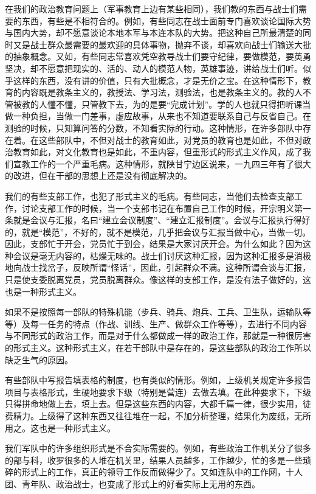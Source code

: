 在我们的政治教育问题上（军事教育上边有某些相同），我们教的东西与战士们需要的东西，有些是不相符合的。例如，有些同志在战士面前专门喜欢谈论国际大势与国内大势，却不愿意谈论本地本军与本连本队的大势。把这种自己所最清楚的同时又是战士群众最需要的最欢迎的具体事物，抛弃不谈，却喜欢向战士们输送大批的抽象概念。又如，有些同志常喜欢凭空教导战士们要守纪律，要做模范，要英勇坚决，却不愿意把现实的、活的、动人的模范人物，英雄事迹，讲给战士们听。似乎这样的东西，没有讲的价值，只有大批概念，才是无价之宝。在这种情形下，教育的内容既是教条主义的，教授法、学习法，测验法，也是教条主义的。教的人不管被教的人懂不懂，只管教下去，为的是要“完成计划”。学的人也就只得把听课当做一种负担，当做一门差事，虚应故事，从来也不知道要联系自己与反省自己。在测验的时候，只知算问答的分数，不知看实际的行动。这种情形，在许多部队中存在着。在这些部队中，不但对战士的教育如此，对党员的教育也是如此，不但对政治教育如此，对文化教育也是如此，不重内容，但重形式的形式主义作风，成了我们宣教工作的一个严重毛病。这种情形，就陕甘宁边区说来，一九四三年有了很大的改进，但在干部的思想上还是没有彻底解决的。

我们的有些支部工作，也犯了形式主义的毛病。有些同志，当他们去检查支部工作，讨论支部工作的时候，当一个支部书记在布置自己工作的时候，开宗明义第一条就是会议与汇报，名曰“建立会议制度”、“建立汇报制度”。会议与汇报执行得好的，就是“模范”，不好的，就不是模范，几乎把会议与汇报当做中心，当做一切。因此，支部忙于开会，党员忙于到会，结果是大家讨厌开会。为什么如此？因为这种会议是毫无内容的，枯燥无味的。战士们讨厌这种汇报，因为这种汇报多是消极地向战士找岔子，反映所谓“怪话”，因此，引起群众不满。这种所谓会谈与汇报，只是使支委脱离党员，党员脱离群众。像这样的支部工作，是没有法子做好的，这也是一种形式主义。

如果不是按照每一部队的特殊机能（步兵、骑兵、炮兵、工兵、卫生队，运输队等等）及每一任务的特点（作战、训线、生产、做群众工作等等），去进行不同内容与不同形式的政治工作，而是对于什么都做成一样的政治工作，那就是一种很厉害的形式主义。这种形式主义，在若干部队中是存在的，是这些部队的政治工作所以缺乏生气的原因。

有些部队中写报告填表格的制度，也有类似的情形。例如，上级机关规定许多报告项目与表格形式，生硬地要求下级（特别是营连）去做去填。在此种要求下，下级只得拼命地做上去，填上去。但是这些东西的内容，大都千篇一律，很少实用，徒费精力。上级得了这种东西又往往堆在一起，不加分析整理，结果化为废纸，无所用之。这也是一种形式主义。

我们军队中的许多组织形式是不合实际需要的。例如，有些政治工作机关分了很多的部与科，收罗很多的人堆在机关里，结果人员越多，工作越少，忙的多是一些琐碎的形式上的工作，真正的领导工作反而做得少了。又如连队中的工作网，十人团、青年队、政治战士，也变成了形式上的好看实际上无用的东西。

